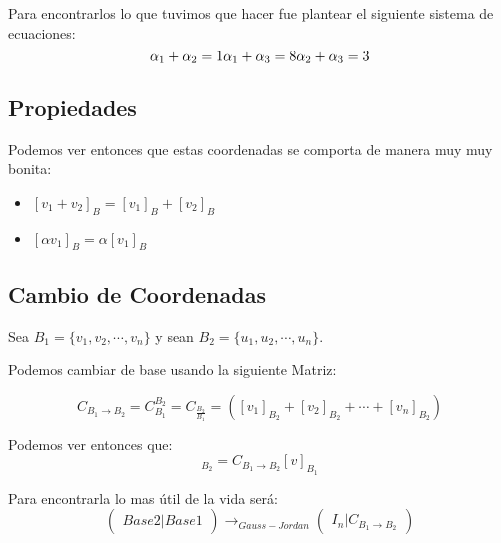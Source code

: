 \documentclass[12pt]{article}							    %
\begin{document}
Para encontrarlos lo que tuvimos que hacer fue plantear el siguiente sistema de ecuaciones:
\begin{equation*}
    \alpha_1 + \alpha_2 = 1  \\
    \alpha_1 + \alpha_3 = 8  \\
    \alpha_2 + \alpha_3 = 3  \\
\end{equation*}



\subsection{Propiedades}
Podemos ver entonces que estas coordenadas se comporta de manera muy muy bonita:

\begin{itemize}
    \item $[v_1 + v_2]_B = [v_1]_B + [v_2]_B$
    \item $[\alpha v_1]_B = \alpha [v_1]_B$
\end{itemize}

\subsection{Cambio de Coordenadas}

Sea $B_1 = \{v_1,v_2, \cdots, v_n\}$ y sean  $B_2 = \{u_1,u_2, \cdots, u_n\}$.

Podemos cambiar de base usando la siguiente Matriz:

\begin{equation*}
    C_{B_1 \to B_2}= C_{B_1}^{B_2} = C_{\frac{B_2}{B_1}} = \left( [v_1]_{B_2} + [v_2]_{B_2} + \cdots + [v_n]_{B_2}   \right)
\end{equation*}

Podemos ver entonces que:
\begin{equation*}
    [v]_{B_2} = C_{B_1 \to B_2} [v]_{B_1}
\end{equation*}

Para encontrarla lo mas útil de la vida será:
\begin{equation}
    \begin{pmatrix}  Base 2  \vert Base 1 \end{pmatrix} \to_{Gauss-Jordan}
    \begin{pmatrix}  I_n  \vert C_{B_1 \to B_2} \end{pmatrix}
\end{equation}
\end{document}
